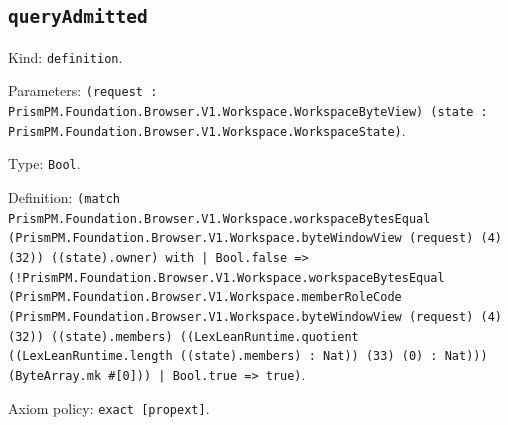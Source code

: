 \documentclass[11pt]{article}
\begin{document}
\subsection*{\texttt{queryAdmitted}}
\noindent Kind: \texttt{definition}.\par
\noindent Parameters: \texttt{(request : PrismPM.Foundation.Browser.V1.Workspace.WorkspaceByteView) (state : PrismPM.Foundation.Browser.V1.Workspace.WorkspaceState)}.\par
\noindent Type: \texttt{Bool}.\par
\noindent Definition: \texttt{(match PrismPM.Foundation.Browser.V1.Workspace.workspaceBytesEqual (PrismPM.Foundation.Browser.V1.Workspace.byteWindowView (request) (4) (32)) ((state).owner) with | Bool.false => (!PrismPM.Foundation.Browser.V1.Workspace.workspaceBytesEqual (PrismPM.Foundation.Browser.V1.Workspace.memberRoleCode (PrismPM.Foundation.Browser.V1.Workspace.byteWindowView (request) (4) (32)) ((state).members) ((LexLeanRuntime.quotient ((LexLeanRuntime.length ((state).members) : Nat)) (33) (0) : Nat))) (ByteArray.mk \#[0])) | Bool.true => true)}.\par
\noindent Axiom policy: \texttt{exact [propext]}.\par
\end{document}
